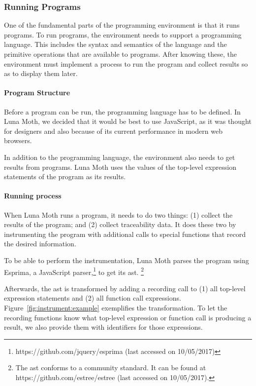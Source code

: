 \subsubsection{Running Programs}
One of the fundamental parts of the programming environment is that it runs programs.
To run programs, the environment needs to support a programming language.
This includes the syntax and semantics of the language and the primitive operations that are available to programs.
After knowing these, the environment must implement a process to run the program and collect results so as to display them later.


\paragraph{Program Structure}
Before a program can be run, the programming language has to be defined.
In Luna Moth, we decided that it would be best to use JavaScript, as it was thought for designers and also because of its current performance in modern web browsers.

In addition to the programming language, the environment also needs to get results from programs.
Luna Moth uses the values of the top-level expression statements of the program as its results.


\paragraph{Running process}
When Luna Moth runs a program, it needs to do two things: (1) collect the results of the program; and (2) collect traceability data.
It does these two by instrumenting the program with additional calls to special functions that record the desired information.

To be able to perform the instrumentation, Luna Moth parses the program using Esprima, a JavaScript parser,\footnote{https://github.com/jquery/esprima (last accessed on 10/05/2017)} to get its \gls{ast}.%
\footnote{The \gls{ast} conforms to a community standard. It can be found at https://github.com/estree/estree (last accessed on 10/05/2017).}

Afterwards, the \gls{ast} is transformed by adding a recording call to (1) all top-level expression statements and (2) all function call expressions.
Figure~\ref{fig:instrument:example} exemplifies the transformation.
To let the recording functions know what top-level expression or function call is producing a result, we also provide them with identifiers for those expressions.

